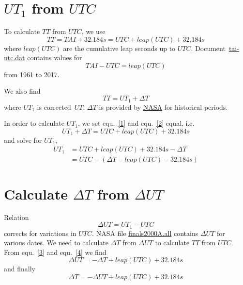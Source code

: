 \documentclass[]{article}
\title{}
\author{Sven Schmidt}
\begin{document}
\maketitle

\begin{abstract}

\end{abstract}

\section{$UT_{1}$ from $UTC$}

To calculate $TT$ from $UTC$, we use
\begin{equation}
\label{1}
TT = TAI + 32.184s = UTC + leap(UTC) + 32.184s
\end{equation}
where $leap(UTC)$ are the cumulative leap seconds up to $UTC$.
Document~\href{https://cddis.nasa.gov/archive/products/iers/tai-utc.dat}{tai-utc.dat}
contains values for
\begin{equation}
TAI - UTC = leap(UTC)
\end{equation}
from 1961 to 2017.

We also find
\begin{equation}
\label{2}
TT = UT_{1} + \Delta T
\end{equation}
where $UT_{1}$ is corrected~\href{https://stjarnhimlen.se/comp/time.html#deltat}{$UT$}.
$\Delta T$ is provided by \href{https://cddis.nasa.gov/archive/products/iers/historic_deltat.data}{NASA}
for historical periods.

In order to calculate $UT_{1}$, we set equ.~\ref{1} and equ.~\ref{2} equal, i.e.
\begin{equation}
UT_{1} + \Delta T = UTC + leap(UTC) + 32.184s
\end{equation}
and solve for $UT_{1}$,
\begin{align}
\label{3}
UT_{1} &= UTC + leap(UTC) + 32.184s - \Delta T \\
       &= UTC - \left( \Delta T - leap(UTC) - 32.184s \right)
\end{align}

\section{Calculate $\Delta T$ from $\Delta UT$}

Relation
\begin{equation}
\label{4}
\Delta UT = UT_{1} - UTC
\end{equation}
corrects for variations in $UTC$.
NASA file \href{https://cddis.nasa.gov/archive/products/iers/finals2000A.all}{finals2000A.all} contains
$\Delta UT$ for various dates.
We need to calculate $\Delta T$ from $\Delta UT$ to calculate $TT$ from $UTC$.
From equ.~\ref{3} and equ.~\ref{4} we find
\begin{equation}
\label{5}
\Delta UT = -\Delta T + leap(UTC) + 32.184s
\end{equation}
and finally
\begin{equation}
\label{6}
\Delta T = -\Delta UT + leap(UTC) + 32.184s
\end{equation}
\end{document}
